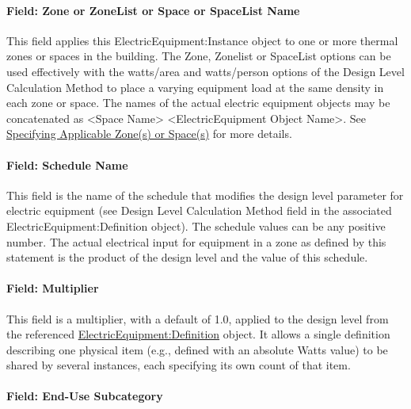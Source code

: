 \paragraph{Field: Zone or ZoneList or Space or SpaceList Name}\label{eleceq-field-zone-or-zonelist-name-000-ee-instance}

This field applies this ElectricEquipment:Instance object to one or more thermal zones or spaces in the building. The Zone, Zonelist or SpaceList options can be used effectively with the watts/area and watts/person options of the Design Level Calculation Method to place a varying equipment load at the same density in each zone or space. The names of the actual electric equipment objects may be concatenated as \textless{}Space Name\textgreater{} \textless{}ElectricEquipment Object Name\textgreater{}. See \hyperref[specifying-applicable-zones-or-spaces]{Specifying Applicable Zone(s) or Space(s)} for more details.

\paragraph{Field: Schedule Name}\label{field-schedule-name-1-001-ee-instance}

This field is the name of the schedule that modifies the design level parameter for electric equipment (see Design Level Calculation Method field in the associated ElectricEquipment:Definition object). The schedule values can be any positive number. The actual electrical input for equipment in a zone as defined by this statement is the product of the design level and the value of this schedule.

\paragraph{Field: Multiplier}\label{field-multiplier-electricequipmentinstance}

This field is a multiplier, with a default of 1.0, applied to the design level from the referenced \hyperref[electricequipmentdefinition]{ElectricEquipment:Definition} object. It allows a single definition describing one physical item (e.g., defined with an absolute Watts value) to be shared by several instances, each specifying its own count of that item.

\paragraph{Field: End-Use Subcategory}\label{field-end-use-subcategory-1-001-ee-instance}

